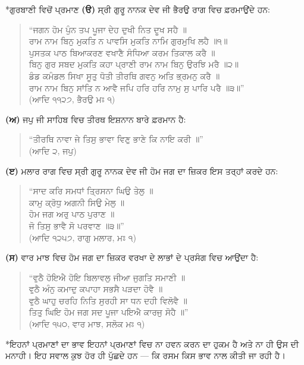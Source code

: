 \documentclass[12pt,a5paper,twoside]{book}  %
\makeatletter
\renewcommand\section{\@startsection{section}{1}{0pt}{1.2em}{0.6em}{\punjabifont\Large\bfseries}}%
\makeatother
\begin{document}
{\section*{ਗੁਰਬਾਣੀ ਵਿਚੋਂ ਪ੍ਰਮਾਣ}
\textbf{(ੳ)} ਸ੍ਰੀ ਗੁਰੂ ਨਾਨਕ ਦੇਵ ਜੀ ਭੈਰਉ ਰਾਗ ਵਿਚ ਫ਼ਰਮਾਉਂਦੇ ਹਨ:
\begin{quote}
“ਜਗਨ ਹੋਮ ਪੁੰਨ ਤਪ ਪੂਜਾ ਦੇਹ ਦੁਖੀ ਨਿਤ ਦੂਖ ਸਹੈ ॥ \\
ਰਾਮ ਨਾਮ ਬਿਨੁ ਮੁਕਤਿ ਨ ਪਾਵਸਿ ਮੁਕਤਿ ਨਾਮਿ ਗੁਰਮੁਖਿ ਲਹੈ ॥੧॥ \\
ਪੁਸਤਕ ਪਾਠ ਬਿਆਕਰਣ ਵਖਾਣੈ ਸੰਧਿਆ ਕਰਮ ਤਿਕਾਲ ਕਰੈ ॥ \\
ਬਿਨੁ ਗੁਰ ਸਬਦ ਮੁਕਤਿ ਕਹਾ ਪ੍ਰਾਣੀ ਰਾਮ ਨਾਮ ਬਿਨੁ ਉਰਝਿ ਮਰੈ ॥੨॥ \\
ਡੰਡ ਕਮੰਡਲ ਸਿਖਾ ਸੂਤੁ ਧੋਤੀ ਤੀਰਥਿ ਗਵਨੁ ਅਤਿ ਭ੍ਰਮਨੁ ਕਰੈ ॥ \\
ਰਾਮ ਨਾਮ ਬਿਨੁ ਸਾਂਤਿ ਨ ਆਵੈ ਜਪਿ ਹਰਿ ਹਰਿ ਨਾਮੁ ਸੁ ਪਾਰਿ ਪਰੈ ॥੩॥” \\
(ਆਦਿ ੧੧੨੭, ਭੈਰਉ ਮਃ ੧)
\end{quote}
\textbf{(ਅ)} ਜਪੁ ਜੀ ਸਾਹਿਬ ਵਿਚ ਤੀਰਥ ਇਸ਼ਨਾਨ ਬਾਰੇ ਫ਼ਰਮਾਨ ਹੈ:
\begin{quote}
“ਤੀਰਥਿ ਨਾਵਾ ਜੇ ਤਿਸੁ ਭਾਵਾ ਵਿਣੁ ਭਾਣੇ ਕਿ ਨਾਇ ਕਰੀ ॥” \\
(ਆਦਿ ੨, ਜਪੁ)
\end{quote}
\textbf{(ੲ)} ਮਲਾਰ ਰਾਗ ਵਿਚ ਸ੍ਰੀ ਗੁਰੂ ਨਾਨਕ ਦੇਵ ਜੀ ਹੋਮ ਜਗ ਦਾ ਜ਼ਿਕਰ ਇਸ ਤਰ੍ਹਾਂ ਕਰਦੇ ਹਨ:
\begin{quote}
“ਸਾਦ ਕਰਿ ਸਮਧਾਂ ਤ੍ਰਿਸਨਾ ਘਿਉ ਤੇਲੁ ॥ \\
ਕਾਮੁ ਕ੍ਰੋਧੁ ਅਗਨੀ ਸਿਉ ਮੇਲੁ ॥ \\
ਹੋਮ ਜਗ ਅਰੁ ਪਾਠ ਪੁਰਾਣ ॥ \\
ਜੋ ਤਿਸੁ ਭਾਵੈ ਸੋ ਪਰਵਾਣ ॥੩॥” \\
(ਆਦਿ ੧੨੫੭, ਰਾਗੁ ਮਲਾਰ, ਮਃ ੧)
\end{quote}
\textbf{(ਸ)} ਵਾਰ ਮਾਝ ਵਿਚ ਹੋਮ ਜਗ ਦਾ ਜ਼ਿਕਰ ਵਰਖਾ ਦੇ ਲਾਭਾਂ ਦੇ ਪ੍ਰਸੰਗ ਵਿਚ ਆਉਂਦਾ ਹੈ:
\begin{quote}
“ਵੁਠੈ ਹੋਇਐ ਹੋਇ ਬਿਲਾਵਲੁ ਜੀਆ ਜੁਗਤਿ ਸਮਾਣੀ ॥ \\
ਵੁਠੈ ਅੰਨੁ ਕਮਾਦੁ ਕਪਾਹਾ ਸਭਸੈ ਪੜਦਾ ਹੋਵੈ ॥ \\
ਵੁਠੈ ਘਾਹੁ ਚਰਹਿ ਨਿਤਿ ਸੁਰਹੀ ਸਾ ਧਨ ਦਹੀ ਵਿਲੋਵੈ ॥ \\
ਤਿਤੁ ਘਿਇ ਹੋਮ ਜਗ ਸਦ ਪੂਜਾ ਪਇਐ ਕਾਰਜੁ ਸੋਹੈ ॥” \\
(ਆਦਿ ੧੫੦, ਵਾਰ ਮਾਝ, ਸਲੋਕ ਮਃ ੧)
\end{quote}

\section*{ਇਹਨਾਂ ਪ੍ਰਮਾਣਾਂ ਦਾ ਭਾਵ}
ਇਹਨਾਂ ਪ੍ਰਮਾਣਾਂ ਵਿਚ ਨਾ ਹਵਨ ਕਰਨ ਦਾ ਹੁਕਮ ਹੈ ਅਤੇ ਨਾ ਹੀ ਉਸ ਦੀ ਮਨਾਹੀ। ਇਹ ਸਵਾਲ ਕੁਝ ਹੋਰ ਹੀ ਪੁੱਛਦੇ ਹਨ — ਕਿ ਰਸਮ ਕਿਸ ਭਾਵ ਨਾਲ ਕੀਤੀ ਜਾ ਰਹੀ ਹੈ।

}
\end{document}
